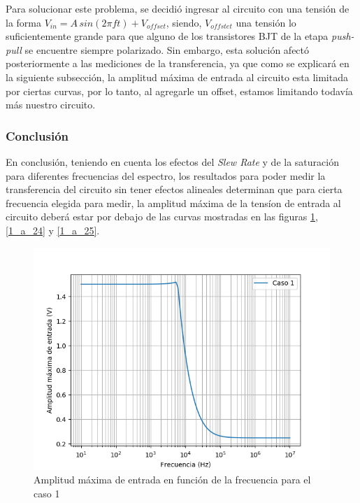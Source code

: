 Para solucionar este problema, se decidió ingresar al circuito con
una tensión de la forma $V_{in}=A\,sin(2\pi ft)+V_{offset}$, siendo,
$V_{offstet}$ una tensión lo suficientemente grande para que alguno
de los transistores BJT de la etapa \emph{push-pull} se encuentre
siempre polarizado. Sin embargo, esta solución afectó posteriormente
a las mediciones de la transferencia, ya que como se explicará en
la siguiente subsección, la amplitud máxima de entrada al circuito
esta limitada por ciertas curvas, por lo tanto, al agregarle un offset,
estamos limitando todavía más nuestro circuito.

\subsubsection{Conclusión}

En conclusión, teniendo en cuenta los efectos del \emph{Slew Rate}
y de la saturación para diferentes frecuencias del espectro, los resultados
para poder medir la transferencia del circuito sin tener efectos alineales
determinan que para cierta frecuencia elegida para medir, la amplitud
máxima de la tensíon de entrada al circuito deberá estar por debajo
de las curvas mostradas en las figuras \ref{1_a_21}, \ref{1_a_24}
y \ref{1_a_25}.

\begin{figure}[H]
\begin{centering}
\includegraphics[scale=0.5]{../Ex1/iA/Resources1a/AmplMaxVsFreq1}
\par\end{centering}
\caption{Amplitud máxima de entrada en función de la frecuencia para el caso
1}
\label{1_a_21}

\end{figure}

